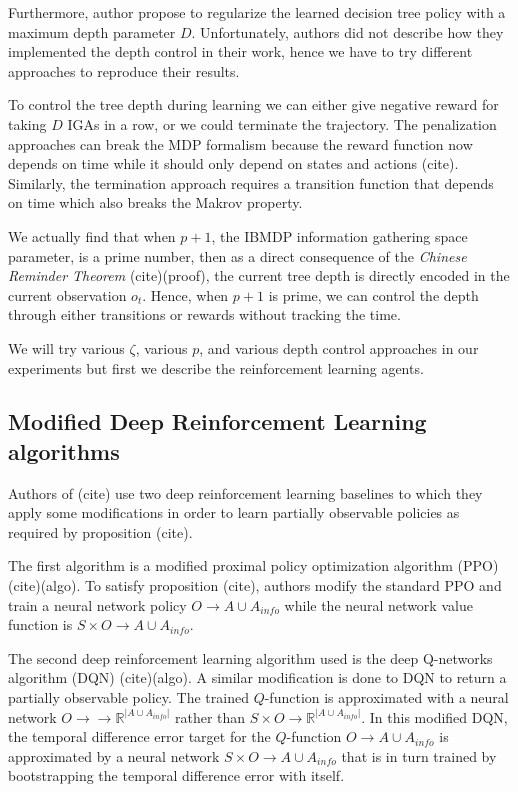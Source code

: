 Furthermore, author propose to regularize the learned decision tree policy with a maximum depth parameter $D$.
Unfortunately, authors did not describe how they implemented the depth control in their work, hence we have to try different approaches to reproduce their results.

To control the tree depth during learning we can either give negative reward for taking $D$ IGAs in a row, or we could terminate the trajectory. 
The penalization approaches can break the MDP formalism because the reward function now depends on time while it should only depend on states and actions (cite).
Similarly, the termination approach requires a transition function that depends on time which also breaks the Makrov property.

We actually find that when $p+1$, the IBMDP information gathering space parameter, is a prime number, then as a direct consequence of the \textit{Chinese Reminder Theorem} (cite)(proof), the current tree depth is directly encoded in the current observation $o_t$. 
Hence, when $p+1$ is prime, we can control the depth through either transitions or rewards without tracking the time.

We will try various $\zeta$, various $p$, and various depth control approaches in our experiments but first we describe the reinforcement learning agents.


\subsection{Modified Deep Reinforcement Learning algorithms}
Authors of (cite) use two deep reinforcement learning baselines to which they apply some modifications in order to learn partially observable policies as required by proposition (cite).

The first algorithm is a modified proximal policy optimization algorithm (PPO)(cite)(algo).
To satisfy proposition (cite), authors modify the standard PPO and train a neural network policy $O\rightarrow A\cup A_{info}$ while the neural network value function is $S\times O\rightarrow A\cup A_{info}$.

The second deep reinforcement learning algorithm used is the deep Q-networks algorithm (DQN) (cite)(algo).
A similar modification is done to DQN to return a partially observable policy. The trained $Q$-function is approximated with a neural network $O\rightarrow \rightarrow \mathbb{R}^{|A\cup A_{info}|}$ rather than $S\times O\rightarrow \mathbb{R}^{|A\cup A_{info}|}$.
In this modified DQN, the temporal difference error target for the $Q$-function $O\rightarrow A\cup A_{info}$ is approximated by a neural network $S\times O\rightarrow A\cup A_{info}$ that is in turn trained by bootstrapping the temporal difference error with itself.


